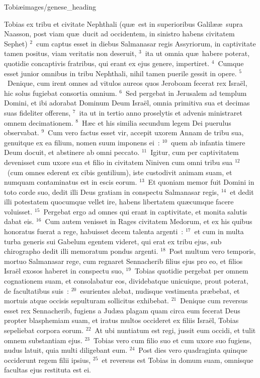 {Tobiæ}{images/genese_heading}


\lettrine[lines=10,image=true,loversize=0.05,lraise=-0.03]{T}{}obias ex tribu et civitate Nephthali (qu\ae\ est in superioribus Galil\ae \ae\ supra Naasson, post viam qu\ae\ ducit ad occidentem, in sinistro habens civitatem Sephet)
${}^{2}$~cum captus esset in diebus Salmanasar regis Assyriorum, in captivitate tamen positus, viam veritatis non deseruit,
${}^{3}$~ita ut omnia qu\ae\ habere poterat, quotidie concaptivis fratribus, qui erant ex ejus genere, impertiret.
${}^{4}$~Cumque esset junior omnibus in tribu Nephthali, nihil tamen puerile gessit in opere.
${}^{5}$~Denique, cum irent omnes ad vitulos aureos quos Jeroboam fecerat rex Isra\"el, hic solus fugiebat consortia omnium.
${}^{6}$~Sed pergebat in Jerusalem ad templum Domini, et ibi adorabat Dominum Deum Isra\"el, omnia primitiva sua et decimas suas fideliter offerens,
${}^{7}$~ita ut in tertio anno proselytis et advenis ministraret omnem decimationem.
${}^{8}$~H\ae c et his similia secundum legem Dei puerulus observabat.
${}^{9}$~Cum vero factus esset vir, accepit uxorem Annam de tribu sua, genuitque ex ea filium, nomen suum imponens ei~:
${}^{10}$~quem ab infantia timere Deum docuit, et abstinere ab omni peccato.
${}^{11}$~Igitur, cum per captivitatem devenisset cum uxore sua et filio in civitatem Niniven cum omni tribu sua
${}^{12}$~(cum omnes ederent ex cibis gentilium), iste custodivit animam suam, et numquam contaminatus est in escis eorum.
${}^{13}$~Et quoniam memor fuit Domini in toto corde suo, dedit illi Deus gratiam in conspectu Salmanasar regis,
${}^{14}$~et dedit illi potestatem quocumque vellet ire, habens libertatem qu\ae cumque facere voluisset.
${}^{15}$~Pergebat ergo ad omnes qui erant in captivitate, et monita salutis dabat eis.
${}^{16}$~Cum autem venisset in Rages civitatem Medorum, et ex his quibus honoratus fuerat a rege, habuisset decem talenta argenti~:
${}^{17}$~et cum in multa turba generis sui Gabelum egentem videret, qui erat ex tribu ejus, sub chirographo dedit illi memoratum pondus argenti.
${}^{18}$~Post multum vero temporis, mortuo Salmanasar rege, cum regnaret Sennacherib filius ejus pro eo, et filios Isra\"el exosos haberet in conspectu suo,
${}^{19}$~Tobias quotidie pergebat per omnem cognationem suam, et consolabatur eos, dividebatque unicuique, prout poterat, de facultatibus suis~:
${}^{20}$~esurientes alebat, nudisque vestimenta pr\ae bebat, et mortuis atque occisis sepulturam sollicitus exhibebat.
${}^{21}$~Denique cum reversus esset rex Sennacherib, fugiens a Jud\ae a plagam quam circa eum fecerat Deus propter blasphemiam suam, et iratus multos occideret ex filiis Isra\"el, Tobias sepeliebat corpora eorum.
${}^{22}$~At ubi nuntiatum est regi, jussit eum occidi, et tulit omnem substantiam ejus.
${}^{23}$~Tobias vero cum filio suo et cum uxore suo fugiens, nudus latuit, quia multi diligebant eum.
${}^{24}$~Post dies vero quadraginta quinque occiderunt regem filii ipsius,
${}^{25}$~et reversus est Tobias in domum suam, omnisque facultas ejus restituta est ei.

